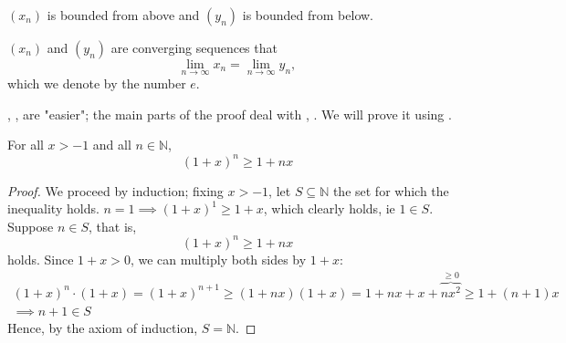 \documentclass[12pt]{article}
\begin{document}
\begin{proposition}[Step 4]\label{prop:eulerstep4}
 $(x_n)$ is bounded from above and $(y_n)$ is bounded from below. \footnotemark
\end{proposition}

\begin{proposition}[Step 5]\label{prop:eulerstep5}
  $(x_n)$ and $(y_n)$ are converging sequences that \[
  \lim_{n\to\infty} x_n = \lim_{n\to\infty} y_n,  
  \]
  which we denote by the number $e$.\footnotemark
\end{proposition}

\begin{remark}
  , ,  are "easier"; the main parts of the proof deal with , . We will prove it using .
\end{remark}

\begin{proposition}\label{prop:bernoullineq}
  For all $x > -1$ and all $n \in \mathbb{N}$, \[
  (1+x)^n \geq 1 + nx  
  \]
\end{proposition}
\begin{proof}
  We proceed by induction; fixing $x > -1$, let $S \subseteq \mathbb{N}$ the set for which the inequality holds. $n = 1 \implies (1+x)^1 \geq 1 + x$, which clearly holds, ie $1 \in S$. Suppose $n \in S$, that is, \[
  (1+x)^n \geq 1 + nx  
  \] holds. Since $1 + x > 0$, we can multiply both sides by $1+x$:
  \begin{align*}
    (1+x)^{n} \cdot (1+x) = (1+x)^{n+1} \geq (1+nx)(1+x) = 1+ nx + x +\overbrace{nx^2}^{\geq 0} \geq 1 + (n+1) x\\
    \implies n + 1 \in S
  \end{align*}
  Hence, by the axiom of induction, $S = \mathbb{N}$.
\end{proof}
\end{document}
